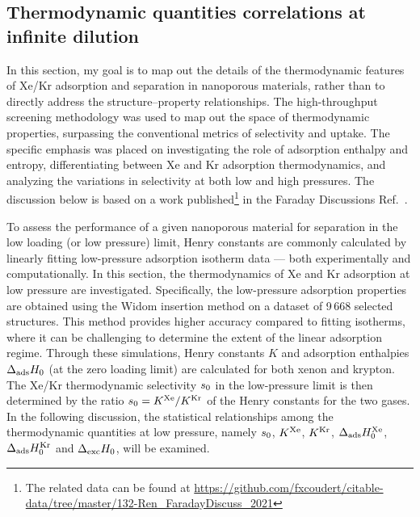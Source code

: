 \documentclass[main.tex]{subfiles}
\begin{document}
\subsection{Thermodynamic quantities correlations at infinite dilution}

In this section, my goal is to map out the details of the thermodynamic features of Xe/Kr adsorption and separation in nanoporous materials, rather than to directly address the structure--property relationships. The high-throughput screening methodology was used to map out the space of thermodynamic properties, surpassing the conventional metrics of selectivity and uptake. The specific emphasis was placed on investigating the role of adsorption enthalpy and entropy, differentiating between Xe and Kr adsorption thermodynamics, and analyzing the variations in selectivity at both low and high pressures. The discussion below is based on a work published\footnote[1]{The related data can be found at \url{https://github.com/fxcoudert/citable-data/tree/master/132-Ren_FaradayDiscuss_2021}} in the Faraday Discussions Ref.~\cite{Ren_2021}.

To assess the performance of a given nanoporous material for separation in the low loading (or low pressure) limit, Henry constants are commonly calculated by linearly fitting low-pressure adsorption isotherm data --- both experimentally and computationally. In this section, the thermodynamics of Xe and Kr adsorption at low pressure are investigated. Specifically, the low-pressure adsorption properties are obtained using the Widom insertion method\autocite{Widom1963, frenkel2001widom} on a dataset of 9\,668 selected structures. This method provides higher accuracy compared to fitting isotherms, where it can be challenging to determine the extent of the linear adsorption regime. Through these simulations, Henry constants $K$ and adsorption enthalpies $\Delta_{\text{ads}}H_{\text{0}}$ (at the zero loading limit) are calculated for both xenon and krypton. The Xe/Kr thermodynamic selectivity $s_{\text{0}}$ in the low-pressure limit is then determined by the ratio $s_{\text{0}} = K^{\text{Xe}}/K^{\text{Kr}}$ of the Henry constants for the two gases. In the following discussion, the statistical relationships among the thermodynamic quantities at low pressure, namely $s_{\text{0}}$, $K^{\text{Xe}}$, $K^{\text{Kr}}$, $\Delta_{\text{ads}}H_{\text{0}}^{\text{Xe}}$, $\Delta_{\text{ads}}H_{\text{0}}^{\text{Kr}}$ and $\Delta_{\text{exc}}H_{\text{0}}$, will be examined.
\end{document}
